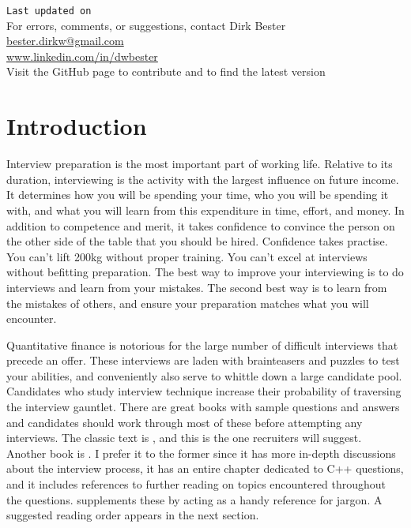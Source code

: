\documentclass[a4paper]{article}
\begin{document}
\vfill
\begin{center}
\texttt{Last updated on } \\
For errors, comments, or suggestions, contact Dirk Bester\\
\href{mailto:bester.dirkw@gmail.com}{bester.dirkw@gmail.com}\\
\href{https://www.linkedin.com/in/dwbester}{www.linkedin.com/in/dwbester}\\
Visit the GitHub page to contribute and to find the latest version
\end{center}


\clearpage

\setcounter{tocdepth}{2}
\tableofcontents

\clearpage

\renewcommand{\thepage}{\arabic{page}}
\setcounter{page}{1}

{}
\section*{Introduction}

Interview preparation is the most important part of working life.
Relative to its duration, interviewing is the activity with the largest influence on future income.
It determines how you will be spending your time, who you will be spending it with, and what you will learn from this expenditure in time, effort, and money.
In addition to competence and merit, it takes confidence to convince the person on the other side of the table that you should be hired.
Confidence takes practise.
You can't lift 200kg without proper training.
You can't excel at interviews without befitting preparation.
The best way to improve your interviewing is to do interviews and learn from your mistakes.
The second best way is to learn from the mistakes of others, and ensure your preparation matches what you will encounter.


Quantitative finance is notorious for the large number of difficult interviews that precede an offer.
These interviews are laden with brainteasers and puzzles to test your abilities, and conveniently also serve to whittle down a large candidate pool.
Candidates who study interview technique increase their probability of traversing the interview gauntlet.
There are great books with sample questions and answers and candidates should work through most of these before attempting any interviews.
The classic text is \citet{HeardOnTheStreet}, and this is the one recruiters will suggest.
Another book is \citet{JoshiQA}.
I prefer it to the former since it has more in-depth discussions about the interview process, it has an entire chapter dedicated to C++ questions, and it includes references to further reading on topics encountered throughout the questions.
\citet{WilmottFAQ} supplements these by acting as a handy reference for jargon.
A suggested reading order appears in the next section.
\end{document}
